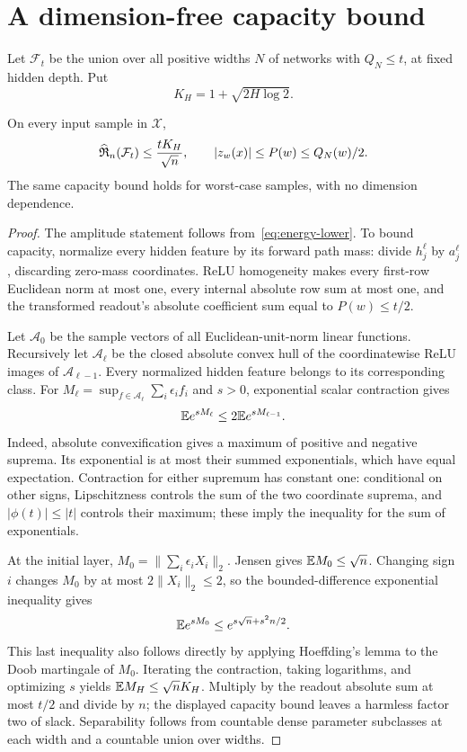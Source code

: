 \section{A dimension-free capacity bound}
Let $\mathcal F_t$ be the union over all positive widths $N$ of networks with $Q_N\le t$, at fixed hidden depth. Put
\[
 K_H=1+\sqrt{2H\log2}.
\]

\begin{lemma}
\label{lem:capacity}
On every input sample in $\mathcal X$,
\[
 \widehat{\mathfrak R}_n(\mathcal F_t)\le\frac{tK_H}{\sqrt n},\qquad
 |z_w(x)|\le P(w)\le Q_N(w)/2.
\]
The same capacity bound holds for worst-case samples, with no dimension dependence.
\end{lemma}
\begin{proof}
The amplitude statement follows from~\eqref{eq:energy-lower}. To bound capacity, normalize every hidden feature by its forward path mass: divide $h_j^\ell$ by $a_j^\ell$, discarding zero-mass coordinates. ReLU homogeneity makes every first-row Euclidean norm at most one, every internal absolute row sum at most one, and the transformed readout's absolute coefficient sum equal to $P(w)\le t/2$.

Let $\mathcal A_0$ be the sample vectors of all Euclidean-unit-norm linear functions. Recursively let $\mathcal A_\ell$ be the closed absolute convex hull of the coordinatewise ReLU images of $\mathcal A_{\ell-1}$. Every normalized hidden feature belongs to its corresponding class. For $M_\ell=\sup_{f\in\mathcal A_\ell}\sum_i\epsilon_if_i$ and $s>0$, exponential scalar contraction gives
\[
 \mathbb E e^{sM_\ell}\le2\mathbb E e^{sM_{\ell-1}}.
\]
Indeed, absolute convexification gives a maximum of positive and negative suprema. Its exponential is at most their summed exponentials, which have equal expectation. Contraction for either supremum has constant one: conditional on other signs, Lipschitzness controls the sum of the two coordinate suprema, and $|\phi(t)|\le|t|$ controls their maximum; these imply the inequality for the sum of exponentials.

At the initial layer, $M_0=\|\sum_i\epsilon_iX_i\|_2$. Jensen gives $\mathbb E M_0\le\sqrt n$. Changing sign $i$ changes $M_0$ by at most $2\|X_i\|_2\le2$, so the bounded-difference exponential inequality gives
\[
 \mathbb E e^{sM_0}\le e^{s\sqrt n+s^2n/2}.
\]
This last inequality also follows directly by applying Hoeffding's lemma to the Doob martingale of $M_0$. Iterating the contraction, taking logarithms, and optimizing $s$ yields $\mathbb E M_H\le\sqrt nK_H$. Multiply by the readout absolute sum at most $t/2$ and divide by $n$; the displayed capacity bound leaves a harmless factor two of slack. Separability follows from countable dense parameter subclasses at each width and a countable union over widths.
\end{proof}
